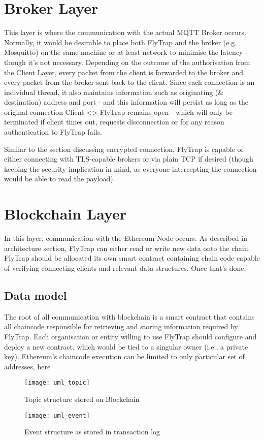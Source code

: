 \section{Broker Layer}

This layer is where the communication with the actual MQTT Broker occurs. Normally, it would be desirable to place both FlyTrap and the broker (e.g. Mosquitto) on the same machine or at least network to minimise the latency - though it's not necessary. Depending on the outcome of the authorisation from the Client Layer, every packet from the client is forwarded to the broker and every packet from the broker sent back to the client. Since each connection is an individual thread, it also maintains information such as originating (\& destination) address and port - and this information will persist as long as the original connection Client <> FlyTrap remains open - which will only be terminated if client times out, requests disconnection or for any reason authentication to FlyTrap fails.

Similar to the section discussing encrypted connection, FlyTrap is capable of either connecting with TLS-capable brokers or via plain TCP if desired (though keeping the security implication in mind, as everyone intercepting the connection would be able to read the payload).

\section{Blockchain Layer}
In this layer, communication with the Ethereum Node occurs. As described in architecture section, FlyTrap can either read or write new data onto the chain. FlyTrap should be allocated its own smart contract containing chain code capable of verifying connecting clients and relevant data structures. Once that's done, 
\subsection{Data model}
The root of all communication with blockchain is a smart contract that contains all chaincode responsible for retrieving and storing information required by FlyTrap. Each organisation or entity willing to use FlyTrap should configure and deploy a new contract, which would be tied to a singular owner (i.e., a private key). Ethereum's chaincode execution can be limited to only particular set of addresses, here 
\begin{figure}[h]
    \centering
    \texttt{[image: uml\_topic]}
    \caption{Topic structure stored on Blockchain}
    \label{fig:uml_topic}
\end{figure}
\begin{figure}[h]
    \centering
    \texttt{[image: uml\_event]}
    \caption{Event structure as stored in transaction log}
    \label{fig:uml_event}
\end{figure}

